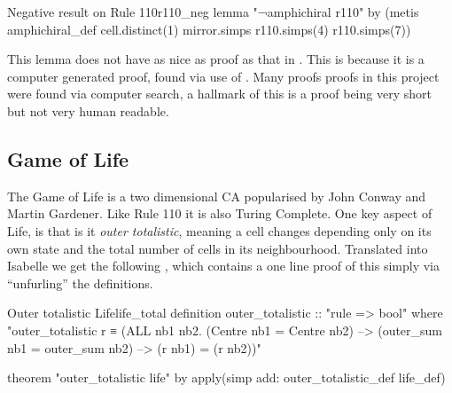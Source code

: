 \begin{myminted}{Negative result on Rule 110}{r110_neg}
    lemma "¬amphichiral r110"
by (metis amphichiral_def cell.distinct(1) mirror.simps r110.simps(4) r110.simps(7))
\end{myminted}

This lemma does not have as nice as proof as that in .
This is because it is a computer generated proof,
found via use of .
Many proofs proofs in this project were found via computer search,
a hallmark of this is a proof being very short but not very human readable.

\subsection{Game of Life}
The Game of Life is a two dimensional CA popularised by John Conway and Martin Gardener.
Like Rule 110 it is also Turing Complete.
One key aspect of Life,
is that is it \emph{outer totalistic},
meaning a cell changes depending only on its own state
and the total number of  cells in its neighbourhood.
Translated into Isabelle we get the following ,
which contains a one line proof of this simply via ``unfurling'' the definitions.

\begin{myminted}{Outer totalistic Life}{life_total}
    definition outer_totalistic :: "rule => bool" where
    "outer_totalistic r ≡ (ALL nb1 nb2. (Centre nb1 = Centre nb2)
    --> (outer_sum nb1 = outer_sum nb2) --> (r nb1) = (r nb2))"

    theorem "outer_totalistic life"
    by apply(simp add: outer_totalistic_def life_def)
\end{myminted}
